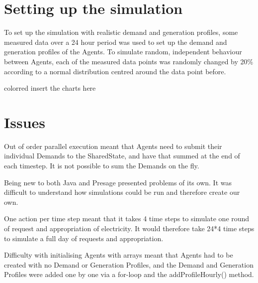 \section{Setting up the simulation}
To set up the simulation with realistic demand and generation profiles, some measured data over a 24 hour period was used to set up the demand and generation profiles of the Agents. To simulate random, independent behaviour between Agents, each of the measured data points was randomly changed by 20\% according to a normal distribution centred around the data point before.

{color{red} insert the charts here}

\section*{Issues}
Out of order parallel execution meant that Agents need to submit their individual Demands to the SharedState, and have that summed at the end of each timestep. It is not possible to sum the Demands on the fly.

Being new to both Java and Presage presented problems of its own. It was difficult to understand how simulations could be run and therefore create our own.

One action per time step meant that it takes 4 time steps to simulate one round of request and appropriation of electricity. It would therefore take 24*4 time steps to simulate a full day of requests and appropriation.

Difficulty with initialising Agents with arrays meant that Agents had to be created with no Demand or Generation Profiles, and the Demand and Generation Profiles were added one by one via a for-loop and the addProfileHourly() method.


